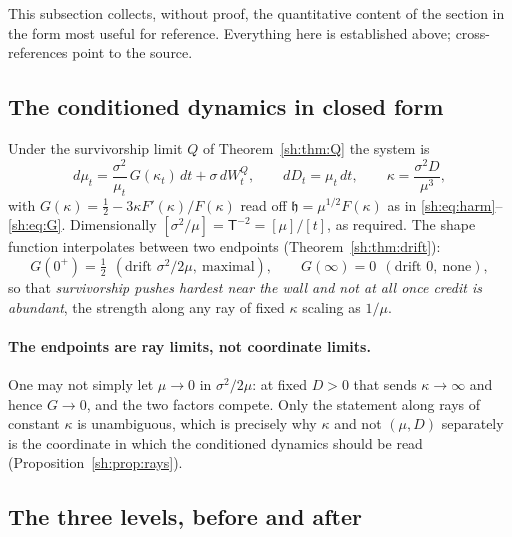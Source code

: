 \documentclass[11pt]{article}
\numberwithin{equation}{section}
\theoremstyle{plain}
\theoremstyle{definition}
\theoremstyle{remark}
\newcommand{\hm}{\mathfrak{h}}
\begin{document}
This subsection collects, without proof, the quantitative content of the
section in the form most useful for reference. Everything here is
established above; cross-references point to the source.

\subsection{The conditioned dynamics in closed form}
\label{sh:subsub:sheet:dyn}

Under the survivorship limit $Q$ of Theorem~\ref{sh:thm:Q} the system is
\begin{equation}\label{sh:eq:sheet}
d\mu_t=\frac{\sigma^2}{\mu_t}\,G(\kappa_t)\,dt+\sigma\,dW^Q_t,
\qquad
dD_t=\mu_t\,dt,
\qquad
\kappa=\frac{\sigma^2D}{\mu^3},
\end{equation}
with $G(\kappa)=\tfrac12-3\kappa F'(\kappa)/F(\kappa)$ read off
$\hm=\mu^{1/2}F(\kappa)$ as in \eqref{sh:eq:harm}--\eqref{sh:eq:G}.
Dimensionally $[\sigma^2/\mu]=\mathsf T^{-2}=[\mu]/[t]$, as required. The
shape function interpolates between two endpoints
(Theorem~\ref{sh:thm:drift}):
\[
G(0^+)=\tfrac12\ \ (\text{drift }\sigma^2/2\mu,\ \text{maximal}),
\qquad
G(\infty)=0\ \ (\text{drift }0,\ \text{none}),
\]
so that \emph{survivorship pushes hardest near the wall and not at all
once credit is abundant}, the strength along any ray of fixed $\kappa$
scaling as $1/\mu$.

\paragraph{The endpoints are ray limits, not coordinate limits.}\label{sh:rem:raylimit}
One may not simply let $\mu\to0$ in $\sigma^2/2\mu$: at fixed $D>0$ that
sends $\kappa\to\infty$ and hence $G\to0$, and the two factors compete.
Only the statement along rays of constant $\kappa$ is unambiguous, which
is precisely why $\kappa$ and not $(\mu,D)$ separately is the coordinate
in which the conditioned dynamics should be read
(Proposition~\ref{sh:prop:rays}).

\subsection{The three levels, before and after}
\label{sh:subsub:sheet:levels}
\end{document}
